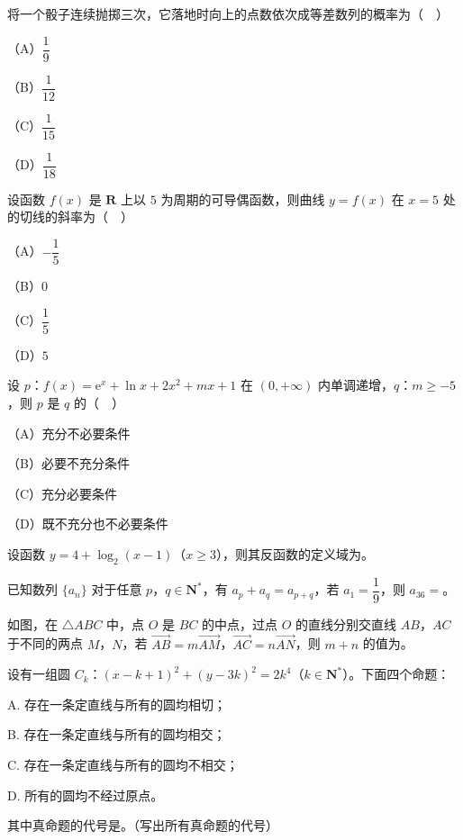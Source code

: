 \begin{question}
将一个骰子连续抛掷三次，它落地时向上的点数依次成等差数列的概率为（　）

（A）$\dfrac19$

（B）$\dfrac1{12}$

（C）$\dfrac1{15}$

（D）$\dfrac1{18}$

\end{question}
\begin{question}
设函数 $f(x)$ 是 $\mathbf R$ 上以 $5$ 为周期的可导偶函数，则曲线 $y=f(x)$ 在 $x=5$ 处的切线的斜率为（　）

（A）$-\dfrac15$

（B）$0$

（C）$\dfrac15$

（D）$5$

\end{question}
\begin{question}
设 $p$：$f(x)=\mathrm e^x+\ln x+2x^2+mx+1$ 在 $(0,+\infty)$ 内单调递增，$q$：$m\geqslant-5$，则 $p$ 是 $q$ 的（　）

（A）充分不必要条件

（B）必要不充分条件

（C）充分必要条件

（D）既不充分也不必要条件

\end{question}

\begin{question}
设函数 $y=4+\log_2(x-1)$（$x\geqslant3$），则其反函数的定义域为\gkblank{}。

\end{question}
\begin{question}
已知数列 $\{a_n\}$ 对于任意 $p$，$q\in\mathbf N^*$，有 $a_p+a_q=a_{p+q}$，若 $a_1=\dfrac19$，则 $a_{36}=$\gkblank{}。

\Needspace{0.4\textheight}
\end{question}
\begin{question}
如图，在 $\triangle ABC$ 中，点 $O$ 是 $BC$ 的中点，过点 $O$ 的直线分别交直线 $AB$，$AC$ 于不同的两点 $M$，$N$，若 $\overrightarrow{AB}=m\overrightarrow{AM}$，$\overrightarrow{AC}=n\overrightarrow{AN}$，则 $m+n$ 的值为\gkblank{}。
\nopagebreak[4]
\begin{center}\end{center}
\nopagebreak[4]
\end{question}
\begin{question}
设有一组圆 $C_k$：$(x-k+1)^2+(y-3k)^2=2k^4$（$k\in\mathbf N^*$）。下面四个命题：

A. 存在一条定直线与所有的圆均相切；

B. 存在一条定直线与所有的圆均相交；

C. 存在一条定直线与所有的圆均不相交；

D. 所有的圆均不经过原点。

其中真命题的代号是\gkblank{}。（写出所有真命题的代号）

\end{question}

